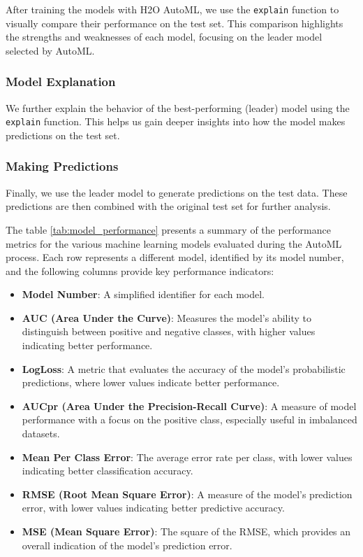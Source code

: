 \documentclass{llncs}
\begin{document}
After training the models with H2O AutoML, we use the \texttt{explain} function to visually compare their performance on the test set. This comparison highlights the strengths and weaknesses of each model, focusing on the leader model selected by AutoML.

\subsubsection{Model Explanation}

We further explain the behavior of the best-performing (leader) model using the \texttt{explain} function. This helps us gain deeper insights into how the model makes predictions on the test set.

\subsubsection{Making Predictions}

Finally, we use the leader model to generate predictions on the test data. These predictions are then combined with the original test set for further analysis.


The table \ref{tab:model_performance} presents a summary of the performance metrics for the various machine learning models evaluated during the AutoML process. Each row represents a different model, identified by its model number, and the following columns provide key performance indicators:

\begin{itemize}
	\item \textbf{Model Number}: A simplified identifier for each model.
	\item \textbf{AUC (Area Under the Curve)}: Measures the model's ability to distinguish between positive and negative classes, with higher values indicating better performance.
	\item \textbf{LogLoss}: A metric that evaluates the accuracy of the model's probabilistic predictions, where lower values indicate better performance.
	\item \textbf{AUCpr (Area Under the Precision-Recall Curve)}: A measure of model performance with a focus on the positive class, especially useful in imbalanced datasets.
	\item \textbf{Mean Per Class Error}: The average error rate per class, with lower values indicating better classification accuracy.
	\item \textbf{RMSE (Root Mean Square Error)}: A measure of the model's prediction error, with lower values indicating better predictive accuracy.
	\item \textbf{MSE (Mean Square Error)}: The square of the RMSE, which provides an overall indication of the model's prediction error.
\end{itemize}
\end{document}
